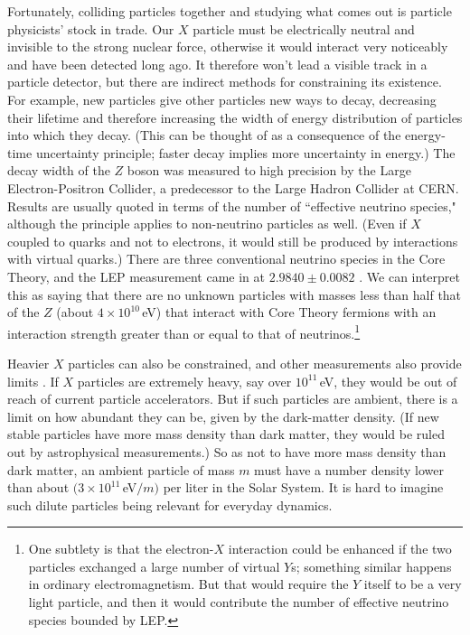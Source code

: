\documentclass[12pt,letterpaper]{article}
\begin{document}
Fortunately, colliding particles together and studying what comes out is particle physicists' stock in trade.
Our $X$ particle must be electrically neutral and invisible to the strong nuclear force, otherwise it would interact very noticeably and have been detected long ago.
It therefore won't lead a visible track in a particle detector, but there are indirect methods for constraining its existence.
For example, new particles give other particles new ways to decay, decreasing their lifetime and therefore increasing the width of energy distribution of particles into which they decay.
(This can be thought of as a consequence of the energy-time uncertainty principle; faster decay implies more uncertainty in energy.)
The decay width of the $Z$ boson was measured to high precision by the Large Electron-Positron Collider, a predecessor to the Large Hadron Collider at CERN.
Results are usually quoted in terms of the number of ``effective neutrino species," although the principle applies to non-neutrino particles as well.
(Even if $X$ coupled to quarks and not to electrons, it would still be produced by interactions with virtual quarks.)
There are three conventional neutrino species in the Core Theory, and the LEP measurement came in at $2.9840 \pm 0.0082$ \citep{mele2015measurement}.
We can interpret this as saying that there are no unknown particles with masses less than half that of the $Z$ (about $4\times 10^{10}$\,eV) that interact with Core Theory fermions with an interaction strength greater than or equal to that of neutrinos.\footnote{One subtlety is that the electron-$X$ interaction could be enhanced if the two particles exchanged a large number of virtual $Y$s; something similar happens in ordinary electromagnetism. But that would require the $Y$ itself to be a very light particle, and then it would contribute the number of effective neutrino species bounded by LEP.}

Heavier $X$ particles can also be constrained, and other measurements also provide limits \citep{Acciarri_1999,Fox_2012,Aad:2020cws}.
If $X$ particles are extremely heavy, say over $10^{11}$\,eV, they would be out of reach of current particle accelerators. 
But if such particles are ambient, there is a limit on how abundant they can be, given by the dark-matter density. 
(If new stable particles have more mass density than dark matter, they would be ruled out by astrophysical measurements.)
So as not to have more mass density than dark matter, an ambient particle of mass $m$ must have a number density lower than about $(3\times 10^{11}$\,eV$/m)$ per liter in the Solar System. It is hard to imagine such dilute particles being relevant for everyday dynamics.
\end{document}
